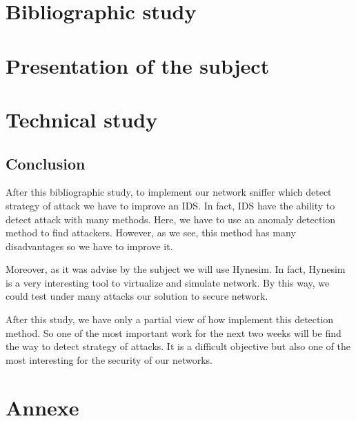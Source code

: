 \documentclass[a4paper, 11pt, oneside, oldfontcommands]{memoir}
\newcounter{th}[chapter]
\begin{document}
\part{Bibliographic study}
  
  
  

\part{Presentation of the subject}
  
  
  

\part{Technical study}
  
  
  




\chapter*{Conclusion}


After this bibliographic study, to implement our network sniffer which detect strategy of attack we have to improve
an IDS. In fact, IDS have the ability to detect attack with many methods. Here, we have to use an anomaly detection
method to find attackers. However, as we see, this method has many disadvantages so we have to improve it.

Moreover, as it was advise by the subject we will use Hynesim. In fact, Hynesim is a very interesting tool to
virtualize and simulate network. By this way, we could test under many attacks our solution to secure network.

After this study, we have only a partial view of how implement this detection method. So one of the most important
work for the next two weeks will be find the way to detect strategy of attacks. It is a difficult objective but
also one of the most interesting for the security of our networks.


\newpage


\part*{Annexe}
\appendix
\nocite{*}

\newpage
 \listoffigures
 \printindex
 
  
\end{document}
